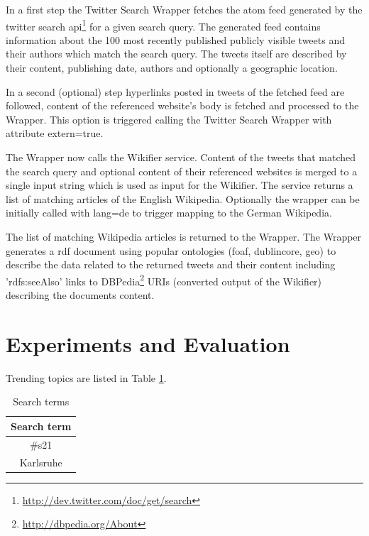 \documentclass{llncs}
\begin{document}
In a first step the Twitter Search Wrapper fetches the atom feed
generated by the twitter search
api\footnote{\url{http://dev.twitter.com/doc/get/search}} for a given search
query. The generated feed contains information about the 100 most recently published publicly visible tweets and
their authors which match the search query. The tweets itself are described by
their content, publishing date, authors and optionally a geographic location. 

In a second (optional) step hyperlinks posted in tweets of the fetched
feed are followed, content of the referenced website's body is fetched and
processed to the Wrapper. This option is triggered calling the Twitter Search
Wrapper with attribute extern=true.

The Wrapper now calls the Wikifier \cite{key:wikifier} service. Content of the
tweets that matched the search query and optional content of their referenced websites is merged
to a single input string which is used as input for the Wikifier. The service
returns a list of matching articles of the English
Wikipedia. Optionally the wrapper can be initially called with lang=de to
trigger mapping to the German Wikipedia.

The list of matching Wikipedia articles is returned to the Wrapper. The Wrapper
generates a rdf document using popular ontologies (foaf, dublincore, geo) to
describe the data related to the returned tweets and their content including 'rdfs:seeAlso' links to
DBPedia\footnote{\url{http://dbpedia.org/About}} URIs (converted output of the
Wikifier) describing the documents content.

\section{Experiments and Evaluation}
\label{sect:eval}

Trending topics are listed in Table \ref{tbl:terms}.

\begin{table}[ht*]
\centering
\begin{tabular}{ c }
Search term                    \\
\hline
\#s21 \\
Karlsruhe\\
\end{tabular}
\caption{Search terms}\label{tbl:terms}
\end{table}

\begin{definition}[Stability]

\end{definition}
\end{document}
